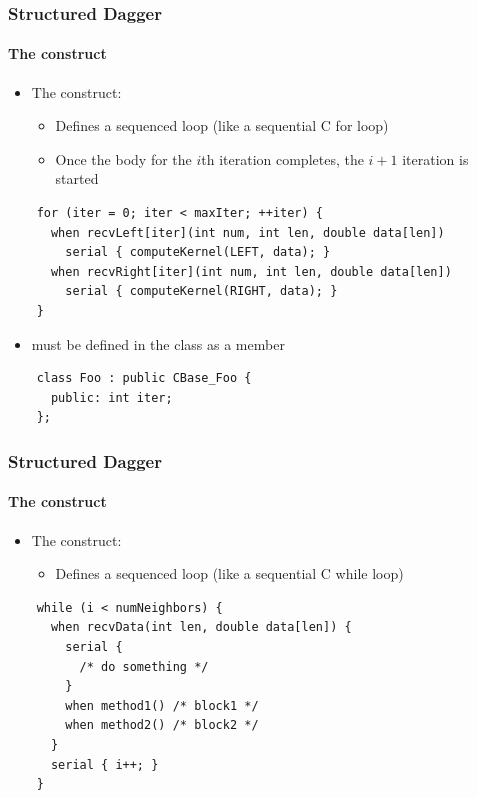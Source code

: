 \begin{frame}[fragile]
  \frametitle{Structured Dagger}
  \framesubtitle{The  construct}
  \begin{itemize}
  \item The  construct:
    \begin{itemize}
    \item Defines a sequenced  loop (like a sequential C for loop)
    \item Once the body for the $i$th iteration completes, the $i+1$ iteration
      is started
    \end{itemize}
  \end{itemize}
  \begin{lstlisting}
    for (iter = 0; iter < maxIter; ++iter) {
      when recvLeft[iter](int num, int len, double data[len])
        serial { computeKernel(LEFT, data); }
      when recvRight[iter](int num, int len, double data[len])
        serial { computeKernel(RIGHT, data); }
    }
  \end{lstlisting}
  \begin{itemize}
  \item {} must be defined in the class as a member
  \end{itemize}
  \begin{lstlisting}
    class Foo : public CBase_Foo {
      public: int iter;
    };
  \end{lstlisting}
\end{frame}

\begin{frame}[fragile]
  \frametitle{Structured Dagger}
  \framesubtitle{The  construct}
  \begin{itemize}
  \item The  construct:
    \begin{itemize}
    \item Defines a sequenced  loop (like a sequential C while loop)
    \end{itemize}
  \end{itemize}
  \begin{lstlisting}
    while (i < numNeighbors) {
      when recvData(int len, double data[len]) {
        serial {
          /* do something */
        }
        when method1() /* block1 */
        when method2() /* block2 */
      }
      serial { i++; }
    }
  \end{lstlisting}
\end{frame}

